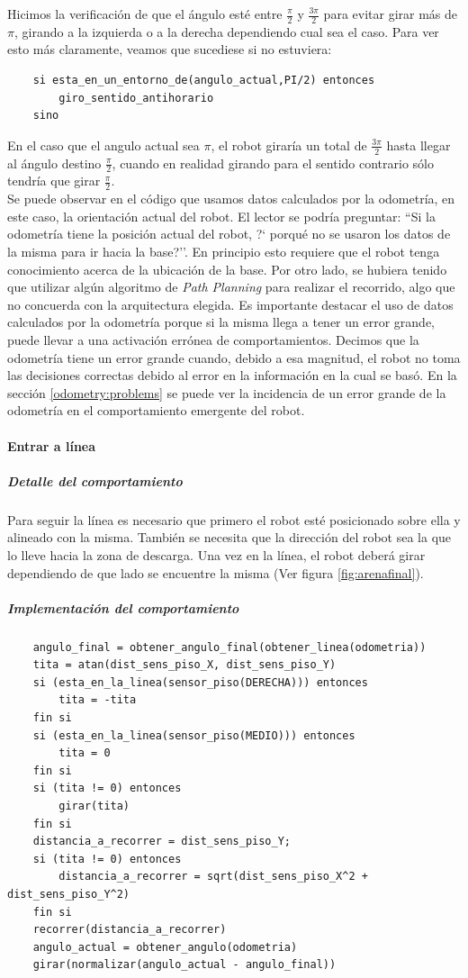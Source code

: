 Hicimos la verificaci\'on de que el \'angulo est\'e entre $\frac{\pi}{2}$ y
$\frac{3\pi}{2}$ para evitar girar m\'as de $\pi$, girando a la izquierda o a
la derecha dependiendo cual sea el caso. Para ver esto m\'as claramente,
veamos que sucediese si no estuviera:
\begin{verbatim}
    si esta_en_un_entorno_de(angulo_actual,PI/2) entonces
        giro_sentido_antihorario
    sino
\end{verbatim}
En el caso que el angulo actual sea $\pi$, el robot girar\'ia un total de
$\frac{3\pi}{2}$ hasta llegar al \'angulo destino $\frac{\pi}{2}$, cuando en
realidad girando para el sentido contrario s\'olo tendr\'ia que girar
$\frac{\pi}{2}$.
\\\indent
Se puede observar en el c\'odigo que usamos datos calculados por la
odometr\'ia, en este caso, la orientaci\'on actual del robot. El lector se
podr\'ia preguntar: ``Si la odometr\'ia tiene la posici\'on actual del robot,
?` porqu\'e no se usaron los datos de la misma para ir hacia la base?''. En
principio esto requiere que el robot tenga conocimiento acerca de la ubicaci\'on
de la base. Por otro lado, se hubiera tenido que utilizar alg\'un algoritmo de
\emph{Path Planning} para realizar el recorrido, algo que no concuerda con
la arquitectura elegida. Es importante destacar el uso de datos calculados por
la odometr\'ia porque si la misma llega a tener un error grande, puede llevar a
una activaci\'on err\'onea de comportamientos. Decimos que la odometr\'ia tiene
un error grande cuando, debido a esa magnitud, el robot no toma las decisiones
correctas debido al error en la informaci\'on en la cual se bas\'o. En la
secci\'on \ref{odometry:problems} se puede ver la incidencia de un error grande
de la odometr\'ia en el comportamiento emergente del robot.

\paragraph{Entrar a l\'inea}
\label{enter_line}
\subparagraph{Detalle del comportamiento}

Para seguir la l\'inea es necesario que primero el robot est\'e posicionado
sobre ella y alineado con la misma. Tambi\'en se necesita que la direcci\'on
del robot sea la que lo lleve hacia la zona de descarga. Una vez en
la l\'inea, el robot deber\'a girar dependiendo de que lado se encuentre la
misma (Ver figura \ref{fig:arenafinal}).

\subparagraph{Implementaci\'on del comportamiento}
\begin{verbatim}
    angulo_final = obtener_angulo_final(obtener_linea(odometria))
    tita = atan(dist_sens_piso_X, dist_sens_piso_Y)
    si (esta_en_la_linea(sensor_piso(DERECHA))) entonces
        tita = -tita
    fin si
    si (esta_en_la_linea(sensor_piso(MEDIO))) entonces
        tita = 0
    fin si
    si (tita != 0) entonces
        girar(tita)
    fin si
    distancia_a_recorrer = dist_sens_piso_Y;
    si (tita != 0) entonces
        distancia_a_recorrer = sqrt(dist_sens_piso_X^2 + dist_sens_piso_Y^2)
    fin si
    recorrer(distancia_a_recorrer)
    angulo_actual = obtener_angulo(odometria)
    girar(normalizar(angulo_actual - angulo_final))
\end{verbatim}

